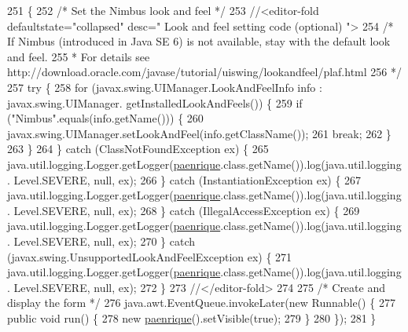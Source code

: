 \begin{DoxyCode}
251                                            \{
252         \textcolor{comment}{/* Set the Nimbus look and feel */}
253         \textcolor{comment}{//<editor-fold defaultstate="collapsed" desc=" Look and feel setting code (optional) ">}
254         \textcolor{comment}{/* If Nimbus (introduced in Java SE 6) is not available, stay with the default look and feel.}
255 \textcolor{comment}{         * For details see http://download.oracle.com/javase/tutorial/uiswing/lookandfeel/plaf.html }
256 \textcolor{comment}{         */}
257         \textcolor{keywordflow}{try} \{
258             \textcolor{keywordflow}{for} (javax.swing.UIManager.LookAndFeelInfo info : javax.swing.UIManager.
      getInstalledLookAndFeels()) \{
259                 \textcolor{keywordflow}{if} (\textcolor{stringliteral}{"Nimbus"}.equals(info.getName())) \{
260                     javax.swing.UIManager.setLookAndFeel(info.getClassName());
261                     \textcolor{keywordflow}{break};
262                 \}
263             \}
264         \} \textcolor{keywordflow}{catch} (ClassNotFoundException ex) \{
265             java.util.logging.Logger.getLogger(\mbox{\hyperlink{classinterfacessoguar_1_1paenrique_aa7ddf4a74bfe7090389039f25ca3572a}{paenrique}}.class.getName()).log(java.util.logging.
      Level.SEVERE, null, ex);
266         \} \textcolor{keywordflow}{catch} (InstantiationException ex) \{
267             java.util.logging.Logger.getLogger(\mbox{\hyperlink{classinterfacessoguar_1_1paenrique_aa7ddf4a74bfe7090389039f25ca3572a}{paenrique}}.class.getName()).log(java.util.logging.
      Level.SEVERE, null, ex);
268         \} \textcolor{keywordflow}{catch} (IllegalAccessException ex) \{
269             java.util.logging.Logger.getLogger(\mbox{\hyperlink{classinterfacessoguar_1_1paenrique_aa7ddf4a74bfe7090389039f25ca3572a}{paenrique}}.class.getName()).log(java.util.logging.
      Level.SEVERE, null, ex);
270         \} \textcolor{keywordflow}{catch} (javax.swing.UnsupportedLookAndFeelException ex) \{
271             java.util.logging.Logger.getLogger(\mbox{\hyperlink{classinterfacessoguar_1_1paenrique_aa7ddf4a74bfe7090389039f25ca3572a}{paenrique}}.class.getName()).log(java.util.logging.
      Level.SEVERE, null, ex);
272         \}
273         \textcolor{comment}{//</editor-fold>}
274 
275         \textcolor{comment}{/* Create and display the form */}
276         java.awt.EventQueue.invokeLater(\textcolor{keyword}{new} Runnable() \{
277             \textcolor{keyword}{public} \textcolor{keywordtype}{void} run() \{
278                 \textcolor{keyword}{new} \mbox{\hyperlink{classinterfacessoguar_1_1paenrique_aa7ddf4a74bfe7090389039f25ca3572a}{paenrique}}().setVisible(\textcolor{keyword}{true});
279             \}
280         \});
281     \}
\end{DoxyCode}


